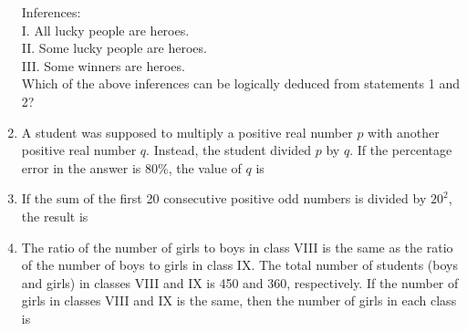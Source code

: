 \documentclass[journal]{IEEEtran}
\begin{document}
\begin{enumerate}[leftmargin=0pt]
Inferences:\\
I. All lucky people are heroes.\\
II. Some lucky people are heroes.\\
III. Some winners are heroes.\\[0.5em]
Which of the above inferences can be logically deduced from statements 1 and 2?
\begin{enumerate}
\end{enumerate}
\hfill{}
\item A student was supposed to multiply a positive real number $p$ with another positive real number $q$. Instead, the student divided $p$ by $q$. If the percentage error in the  answer is 80\%, the value of $q$ is
\begin{enumerate}
\end{enumerate}
\hfill{}
\item If the sum of the first 20 consecutive positive odd numbers is divided by $20^2$, the result is
\begin{enumerate}
\end{enumerate}
\hfill{}
\item The ratio of the number of girls to boys in class VIII is the same as the ratio of the number of boys to girls in class IX. The total number of students (boys and girls) in classes VIII and IX is 450 and 360, respectively. If the number of girls in classes VIII and IX is the same, then the number of girls in each class is

\end{enumerate}
\end{document}
